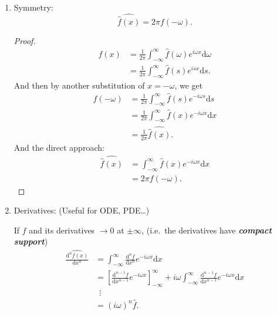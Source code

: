 \documentclass[12pt]{report}
\theoremstyle{definition}
\begin{document}
\begin{enumerate}[label = (\roman*)]
    \item Symmetry:
        \[
            \widehat{\hat{f}(x)} = 2\pi f(-\omega).
        \]
        \begin{proof}
            \[
                \begin{align*}
                    f(x)
                    & = \frac{1}{2\pi}\int_{-\infty}^{\infty} \hat{f}(\omega)e^{i\omega x}\mathrm{d}\omega \\
                    & = \frac{1}{2\pi}\int_{-\infty}^{\infty} \hat{f}(s)e^{isx}\mathrm{d}s.
                \end{align*} 
            \]And then by another substitution of $x = -\omega$, we get\[
                \begin{align*}
                    f(-\omega)
                    & = \frac{1}{2\pi} \int_{-\infty}^{\infty} \hat{f}(s)e^{-i\omega s}\mathrm{d}s \\
                    & = \frac{1}{2\pi}\int_{-\infty}^{\infty} \hat{f}(x)e^{-i\omega x}\mathrm{d}x \\
                    & = \frac{1}{2\pi}\widehat{\hat{f}(x)}.
                \end{align*} 
            \]
            And the direct approach:
            \begin{align*}
                \widehat{\hat{f}(x)}
                & = \int_{-\infty}^{\infty} \hat{f}(x)
                e^{-i\omega x}\mathrm{d}x \\
                & = 2\pi f(-\omega).
            \end{align*} 
        \end{proof} 

    \item Derivatives: (Useful for ODE, PDE\ldots)

        If $f$ and its derivatives $\rightarrow{}0$ at $\pm\infty$,
        (i.e.\ the derivatives have \textbf{\emph{compact support}})
        \begin{align*}
            \widehat{\frac{\mathrm{d}^{n}f(x)}{\mathrm{d}x^{n}}}
            & = \int_{-\infty}^{\infty} \frac{\mathrm{d}^{n}f}{\mathrm{d}x^{n}}e^{-i\omega x}\mathrm{d}x \\
            & = {\left[\frac{\mathrm{d}^{n-1}f}{\mathrm{d}x^{n-1}}e^{-i\omega x}\right]}_{-\infty}^{\infty}
            + i\omega \int_{-\infty}^{\infty} \frac{\mathrm{d}^{n-1}f}{\mathrm{d}x^{n-1}}e^{-i\omega x}\mathrm{d}x \\
            & \;\:\vdots \\
            & = {(i\omega)}^{n}\hat{f}.
        \end{align*} 


\end{enumerate}
\end{document}
